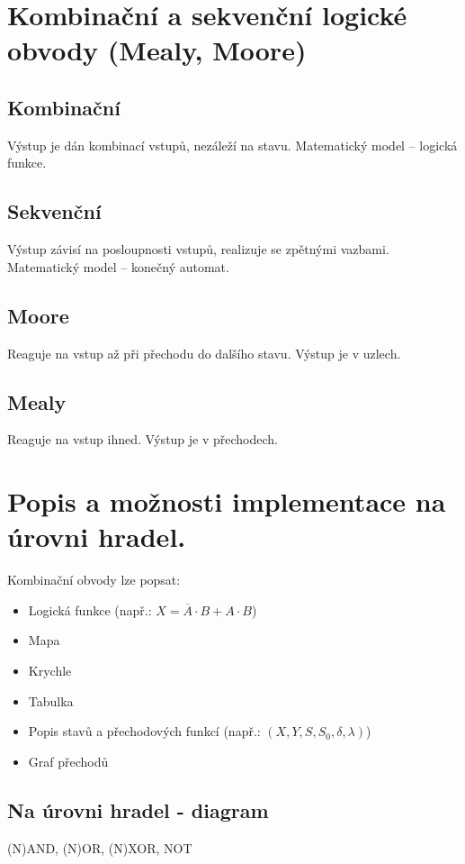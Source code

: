 \documentclass{szzclass}
\begin{document}
\section{Kombinační a sekvenční logické obvody (Mealy, Moore)}
\subsection{Kombinační}
Výstup je dán kombinací vstupů, nezáleží na stavu. Matematický model -- logická funkce.
\subsection{Sekvenční}
Výstup závisí na posloupnosti vstupů, realizuje se zpětnými vazbami. Matematický model -- konečný automat.

\subsection{Moore}
Reaguje na vstup až při přechodu do dalšího stavu. Výstup je v uzlech.

\subsection{Mealy}
Reaguje na vstup ihned. Výstup je v přechodech.

\section{Popis a možnosti implementace na úrovni hradel.}
Kombinační obvody lze popsat:
\begin{itemize}
  \item Logická funkce (např.: $X = \overline{A}\cdot B + A\cdot B$)
  \item Mapa
  \item Krychle
  \item Tabulka
  \item Popis stavů a přechodových funkcí (např.: $(X,Y,S,S_0,\delta,\lambda)$)
  \item Graf přechodů
\end{itemize}

\subsection{Na úrovni hradel - diagram}
(N)AND, (N)OR, (N)XOR, NOT
\end{document}
